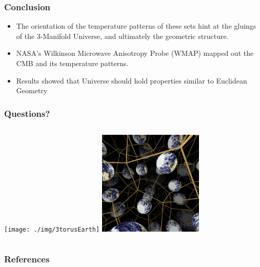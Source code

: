 \documentclass[13pt]{beamer}
\begin{document}
\begin{frame}
\frametitle{Conclusion}
  \begin{itemize}
    \item The orientation of the temperature patterns of these sets hint at the gluings of the 3-Manifold Universe, and ultimately the geometric structure.
    \item NASA's Wilkinson Microwave Anisotropy Probe (WMAP) mapped out the CMB and its temperature patterns.
    \item Results showed that Universe should hold properties similar to Euclidean Geometry
  \end{itemize}


\end{frame}

\begin{frame}
\frametitle{Questions?}
   \begin{columns}[c] %
     \centering
     \texttt{[image: ./img/3torusEarth]} %
     \centering
     \includegraphics[height=5cm]{./img/poincarespaceEarth} %
  \end{columns}
\end{frame}

 \begin{frame}[allowframebreaks]
  \frametitle{References} 
  \scriptsize{}
  
\end{frame}
\end{document}
